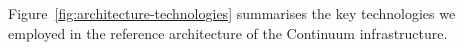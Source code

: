 


Figure~\ref{fig:architecture-technologies} summarises the key technologies we employed in the reference architecture of the Continuum infrastructure.

